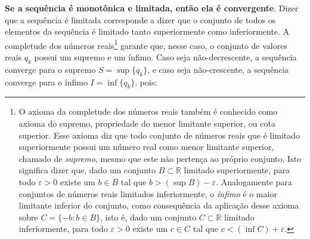 \textbf{Se a sequência é monotônica e limitada,
        então ela é convergente}.
Dizer que a sequência é limitada
corresponde a dizer que o conjunto de todos os elementos da sequência
é limitado tanto superiormente como inferiormente.
A completude dos números reais\footnote{
  O axioma da completude dos números reais
  também é conhecido como axioma do supremo,
  propriedade do menor limitante superior,
  ou cota superior.
  Esse axioma diz que
  todo conjunto de números reais que é limitado superiormente
  possui um número real como menor limitante superior,
  chamado de \emph{supremo},
  mesmo que este não pertença ao próprio conjunto.
  Isto significa dizer que,
  dado um conjunto $B \subset \mathds{R}$ limitado superiormente,
  para todo $\varepsilon > 0$
  existe um $b \in B$
  tal que $b > (\sup B) - \varepsilon$.
  Analogamente
  para conjuntos de números reais limitados inferiormente,
  o \emph{ínfimo} é o maior limitante inferior do conjunto,
  como consequência da aplicação desse axioma
  sobre $C = \{-b: b \in B\}$,
  isto é,
  dado um conjunto $C \subset \mathds{R}$ limitado inferiormente,
  para todo $\varepsilon > 0$
  existe um $c \in C$
  tal que $c < (\inf C) + \varepsilon$.
} garante que, nesse caso, o conjunto de valores reais $q_k$
possui um supremo e um ínfimo.
Caso seja não-decrescente, a sequência converge para o supremo
$S = \sup \{q_k\}$,
e caso seja não-crescente, a sequência converge para o ínfimo
$I = \inf \{q_k\}$,
pois:
